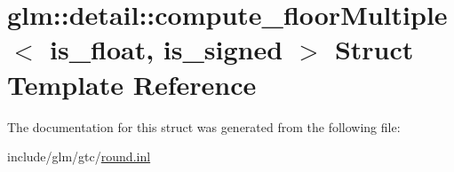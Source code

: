 \hypertarget{structglm_1_1detail_1_1compute__floorMultiple}{}\section{glm\+:\+:detail\+:\+:compute\+\_\+floor\+Multiple$<$ is\+\_\+float, is\+\_\+signed $>$ Struct Template Reference}
\label{structglm_1_1detail_1_1compute__floorMultiple}


The documentation for this struct was generated from the following file\+:\begin{DoxyCompactItemize}
\item 
include/glm/gtc/\hyperlink{round_8inl}{round.\+inl}\end{DoxyCompactItemize}
